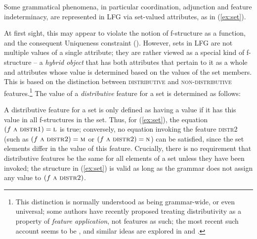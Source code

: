 \documentclass[output=paper,hidelinks]{langscibook}
\begin{document}
 Some grammatical phenomena, in particular coordination, adjunction and feature indeterminacy, are represented in LFG via set-valued attributes, as in (\ref{ex:set}).
 
 \begin{exe}
 \ex{}
 \end{exe}
At first sight, this may appear to violate the notion of f-structure as a function, and the consequent Uniqueness constraint (). However, sets in LFG are not multiple values of a single attribute; they are rather viewed as a special kind of f-structure -- a \textit{hybrid object} that has both attributes that pertain to it as a whole and attributes whose value is determined based on the values of the set members. This is based on the distinction between \textsc{distributive} and \textsc{non-distributive} features.\footnote{This distinction is normally understood as being grammar-wide, or even universal; some authors have recently proposed treating distributivity as a property of \textit{feature application}, not features as such; the most recent such account seems to be \textcite{przepiorkowski-patejuk2012}, and similar ideas are explored in \textcite{belyaev-etal2015} and \textcite{Andrews2018shs}.} The value of a \textit{distributive} feature for a set is determined as follows:
 
 \eas
 \zs%

 \largerpage
\noindent A distributive feature for a set is only defined as having a value if it has this value in all f-structures in the set. Thus, for (\ref{ex:set}), the equation \mbox{$(f~\textsc{a}~\textsc{distr1})=\textsc{l}$} is true; conversely, no equation invoking the feature \textsc{distr2} (such as \mbox{$(f~\textsc{a}~\textsc{distr2})=\textsc{m}$} or \mbox{$(f~\textsc{a}~\textsc{distr2})=\textsc{n}$)} can be satisfied, since the set elements differ in the value of this feature. Crucially, there is no requirement that distributive features be the same for all elements of a set unless they have been invoked; the structure in (\ref{ex:set}) is valid as long as the grammar does not assign any value to $(f~\textsc{a}~\textsc{distr2})$.
 
\end{document}
